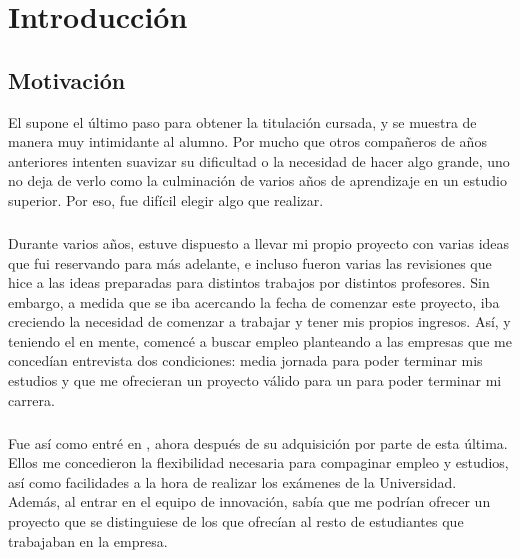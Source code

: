 \documentclass{subfiles}
\begin{document}
    \chapter{Introducción}
    \label{chap:1}

        \section{Motivación}
        \label{sec:1.1}

        {El \TFG supone el último paso para obtener la titulación cursada, y se muestra de manera muy intimidante al alumno. Por mucho que otros compañeros de años anteriores intenten suavizar su dificultad o la necesidad de hacer algo grande, uno no deja de verlo como la culminación de varios años de aprendizaje en un estudio superior. Por eso, fue difícil elegir algo que realizar.}
      
        \paragraph{}
        {Durante varios años, estuve dispuesto a llevar mi propio proyecto con varias ideas que fui reservando para más adelante, e incluso fueron varias las revisiones que hice a las ideas preparadas para distintos trabajos por distintos profesores. Sin embargo, a medida que se iba acercando la fecha de comenzar este proyecto, iba creciendo la necesidad de comenzar a trabajar y tener mis propios ingresos. Así, y teniendo el \TFG en mente, comencé a buscar empleo planteando a las empresas que me concedían entrevista dos condiciones: media jornada para poder terminar mis estudios y que me ofrecieran un proyecto válido para un \tfg para poder terminar mi carrera.}
      
        \paragraph{}
        {Fue así como entré en \silverstorm, ahora \thirdera después de su adquisición por parte de esta última. Ellos me concedieron la flexibilidad necesaria para compaginar empleo y estudios, así como facilidades a la hora de realizar los exámenes de la Universidad. Además, al entrar en el equipo de innovación, sabía que me podrían ofrecer un proyecto que se distinguiese de los que ofrecían al resto de estudiantes que trabajaban en la empresa.}
        
\end{document}
